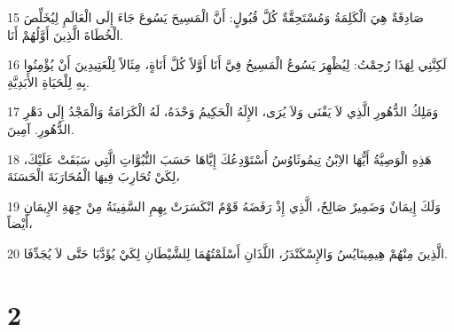 \par 15 صَادِقَةٌ هِيَ الْكَلِمَةُ وَمُسْتَحِقَّةٌ كُلَّ قُبُولٍ: أَنَّ الْمَسِيحَ يَسُوعَ جَاءَ إِلَى الْعَالَمِ لِيُخَلِّصَ الْخُطَاةَ الَّذِينَ أَوَّلُهُمْ أَنَا.
\par 16 لَكِنَّنِي لِهَذَا رُحِمْتُ: لِيُظْهِرَ يَسُوعُ الْمَسِيحُ فِيَّ أَنَا أَوَّلاً كُلَّ أَنَاةٍ، مِثَالاً لِلْعَتِيدِينَ أَنْ يُؤْمِنُوا بِهِ لِلْحَيَاةِ الأَبَدِيَّةِ.
\par 17 وَمَلِكُ الدُّهُورِ الَّذِي لاَ يَفْنَى وَلاَ يُرَى، الإِلَهُ الْحَكِيمُ وَحْدَهُ، لَهُ الْكَرَامَةُ وَالْمَجْدُ إِلَى دَهْرِ الدُّهُورِ. آمِينَ.
\par 18 هَذِهِ الْوَصِيَّةُ أَيُّهَا الاِبْنُ تِيمُوثَاوُسُ أَسْتَوْدِعُكَ إِيَّاهَا حَسَبَ النُّبُوَّاتِ الَّتِي سَبَقَتْ عَلَيْكَ، لِكَيْ تُحَارِبَ فِيهَا الْمُحَارَبَةَ الْحَسَنَةَ،
\par 19 وَلَكَ إِيمَانٌ وَضَمِيرٌ صَالِحٌ، الَّذِي إِذْ رَفَضَهُ قَوْمٌ انْكَسَرَتْ بِهِمِ السَّفِينَةُ مِنْ جِهَةِ الإِيمَانِ أَيْضاً،
\par 20 الَّذِينَ مِنْهُمْ هِيمِينَايُسُ وَالإِسْكَنْدَرُ، اللَّذَانِ أَسْلَمْتُهُمَا لِلشَّيْطَانِ لِكَيْ يُؤَدَّبَا حَتَّى لاَ يُجَدِّفَا.

\chapter{2}

